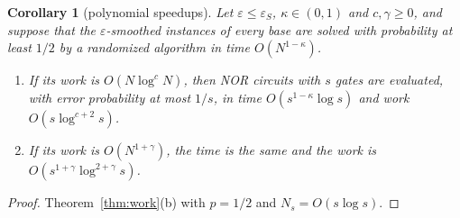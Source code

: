 \documentclass[11pt]{amsart}
\newtheorem{corollary}[theorem]{Corollary}
\theoremstyle{definition}
\theoremstyle{remark}
\newcommand{\eps}{\varepsilon}
\begin{document}
\begin{corollary}[polynomial speedups]\label{cor:speedup}
Let $\eps\le\eps_S$, $\kappa\in(0,1)$ and $c,\gamma\ge0$, and suppose that the $\eps$-smoothed
instances of every base are solved with probability at least $1/2$ by a randomized algorithm in
time $O(N^{1-\kappa})$.
\begin{enumerate}[label=(\alph*),leftmargin=2.4em]
\item If its work is $O(N\log^cN)$, then NOR circuits with $s$ gates are evaluated, with error
probability at most $1/s$, in time $O(s^{1-\kappa}\log s)$ and work $O(s\log^{c+2}s)$.
\item If its work is $O(N^{1+\gamma})$, the time is the same and the work is
$O(s^{1+\gamma}\log^{2+\gamma}s)$.
\end{enumerate}
\end{corollary}

\begin{proof}
Theorem~\ref{thm:work}(b) with $p=1/2$ and $N_s=O(s\log s)$.
\end{proof}
\end{document}

